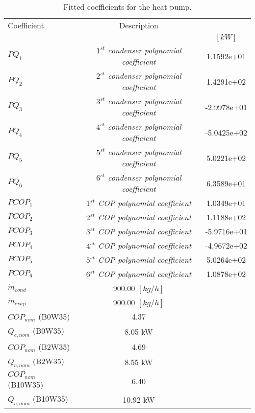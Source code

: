 \documentclass[english]{SPFShortReport}
\author{Dani Carbonell}
\begin{document}
\begin{table}[!ht]
\begin{small}
\caption{Fitted coefficients for the heat pump.}
\begin{center}
\resizebox{12cm}{!} 
{
\begin{tabular}{l | c c } 
\hline
\hline
Coefficient &Description & \\ 
 & &$[kW]$\\ 
\hline
$PQ_{1}$ & \emph{$1^{st}$ condenser polynomial coefficient}  & 1.1592e+01    \\ 
$PQ_{2}$ & \emph{$2^{st}$ condenser polynomial coefficient}  & 1.4291e+02    \\ 
$PQ_{3}$ & \emph{$3^{st}$ condenser polynomial coefficient}  & -2.9978e+01    \\ 
$PQ_{4}$ & \emph{$4^{st}$ condenser polynomial coefficient}  & -5.0425e+02    \\ 
$PQ_{5}$ & \emph{$5^{st}$ condenser polynomial coefficient}  & 5.0221e+02    \\ 
$PQ_{6}$ & \emph{$6^{st}$ condenser polynomial coefficient}  & 6.3589e+01    \\ 
\hline
$PCOP_{1}$ & \emph{$1^{st}$ COP polynomial coefficient}  & 1.0349e+01    \\ 
$PCOP_{2}$ & \emph{$2^{st}$ COP polynomial coefficient}  & 1.1188e+02    \\ 
$PCOP_{3}$ & \emph{$3^{st}$ COP polynomial coefficient}  & -5.9716e+01    \\ 
$PCOP_{4}$ & \emph{$4^{st}$ COP polynomial coefficient}  & -4.9672e+02    \\ 
$PCOP_{5}$ & \emph{$5^{st}$ COP polynomial coefficient}  & 5.0264e+02    \\ 
$PCOP_{6}$ & \emph{$6^{st}$ COP polynomial coefficient}  & 1.0878e+02    \\ 
\hline
$\dot m_{cond}$ & 900.00 $[kg/h]$\\ 
$\dot m_{evap}$ & 900.00 $[kg/h]$\\ 
\hline
$COP_{nom}$ (B0W35)& 4.37 \\ 
$Q_{c,nom}$ (B0W35)& 8.05 kW\\ 
$COP_{nom}$ (B2W35)& 4.69 \\ 
$Q_{c,nom}$ (B2W35)& 8.55 kW\\ 
$COP_{nom}$ (B10W35)& 6.40 \\ 
$Q_{c,nom}$ (B10W35)& 10.92 kW\\ 
\hline
\hline
\end{tabular}
}
\label{CoefTable}
\end{center}
\end{small}
\end{table}
\end{document}
